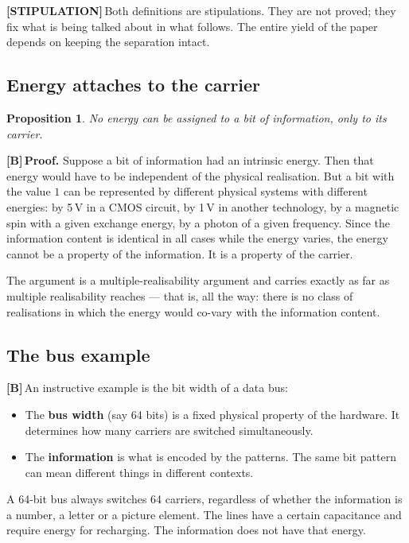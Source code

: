 \documentclass[11pt,a4paper]{article}
\newcommand{\LS}{\textcolor{laySet}{\textbf{\footnotesize\textsf{[STIPULATION]}}}\,}
\newcommand{\LB}{\textcolor{layB}{\textbf{\footnotesize\textsf{[B]}}}\,}
\newcommand{\qedsq}{\raisebox{0.03em}{\framebox[0.62em]{\rule{0pt}{0.42em}}}}
\theoremstyle{ffgft}
\newtheorem{satz}{Proposition}
\begin{document}
\LS Both definitions are stipulations. They are not proved; they fix what is being
talked about in what follows. The entire yield of the paper depends on keeping the
separation intact.

\subsection{Energy attaches to the carrier}

\begin{satz}
No energy can be assigned to a bit of information, only to its carrier.
\end{satz}

\LB \textbf{Proof.} Suppose a bit of information had an intrinsic energy. Then that
energy would have to be independent of the physical realisation. But a bit with
the value $1$ can be represented by different physical systems with different
energies: by 5\,V in a CMOS circuit, by 1\,V in another technology, by a magnetic
spin with a given exchange energy, by a photon of a given frequency. Since the
information content is identical in all cases while the energy varies, the energy
cannot be a property of the information. It is a property of the carrier.
\hfill\qedsq

The argument is a multiple-realisability argument and carries exactly as far as
multiple realisability reaches --- that is, all the way: there is no class of
realisations in which the energy would co-vary with the information content.

\subsection{The bus example}

\LB An instructive example is the bit width of a data bus:

\begin{itemize}[leftmargin=1.4em,itemsep=0.25em]
  \item The \textbf{bus width} (say 64 bits) is a fixed physical property of the
        hardware. It determines how many carriers are switched simultaneously.
  \item The \textbf{information} is what is encoded by the patterns. The same bit
        pattern can mean different things in different contexts.
\end{itemize}

A 64-bit bus always switches 64 carriers, regardless of whether the information is
a number, a letter or a picture element. The lines have a certain capacitance and
require energy for recharging. The information does not have that energy.
\end{document}
